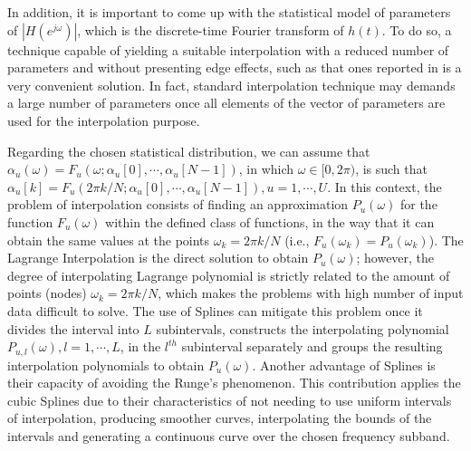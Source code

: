 \documentclass[journal]{IEEEtran}
\begin{document}
In addition, it is important to come up with the statistical model of parameters of $|H(e^{j\omega})|$, which is the discrete-time Fourier transform of $h(t)$. To do so, a technique capable of yielding a suitable interpolation with a reduced number of parameters and without presenting edge effects, such as that ones reported in \cite{Luis:AI} is a very convenient solution. In fact, standard interpolation technique may demands a large number of parameters \cite{mitra} once all elements of the vector of parameters are used for the interpolation purpose. 

Regarding the chosen statistical distribution, we can assume that $\alpha_u (\omega) = F_u(\omega; \alpha_{u}[0], \cdots, \alpha_{u}[N-1])$, in which $\omega \in [0,2\pi)$, is such that $\alpha_{u}[k] = F_u(2\pi k/N; \alpha_{u}[0], \cdots, \alpha_{u}[N-1]),u=1,\cdots,U$. In this context, the problem of interpolation consists of finding an approximation $P_u(\omega)$ for the function $F_u(\omega)$ within the defined class of functions, in the way that it can obtain the same values at the points $\omega_k = 2\pi k/N$ (i.e., $F_u(\omega_k)=P_u(\omega_k)$). The Lagrange Interpolation is the direct solution to obtain $P_u(\omega)$; however, the degree of interpolating Lagrange polynomial is strictly related to the amount of points (nodes)  $\omega_k = 2\pi k/N$, which makes the problems with high number of input data difficult to solve. The use of Splines can mitigate this problem once it divides the interval into $L$ subintervals, constructs the interpolating polynomial $P_{u,l}(\omega),l=1,\cdots,L$, in the $l^{th}$ subinterval separately and groups the resulting interpolation polynomials to obtain $P_u(\omega)$. Another advantage of Splines is their capacity of avoiding the Runge's phenomenon. This contribution applies the cubic Splines \cite{Spline} due to their characteristics of not needing to use uniform intervals of interpolation, producing smoother curves, interpolating the bounds of the intervals and generating a continuous curve over the chosen frequency subband. 
\end{document}
